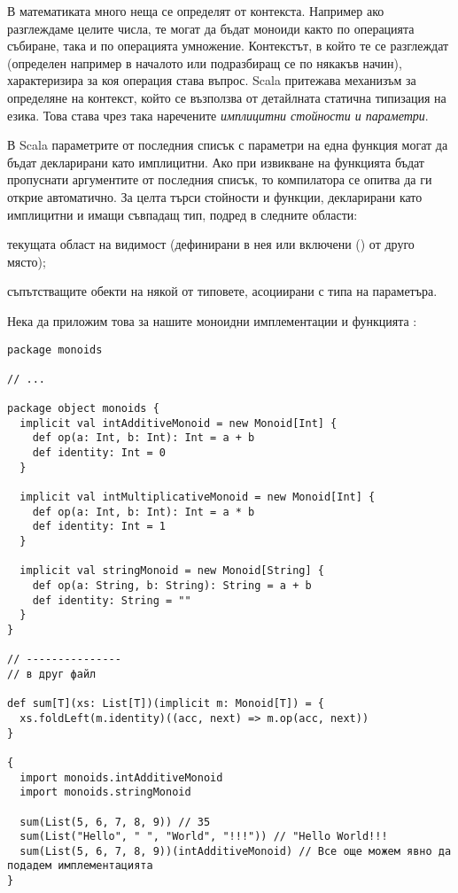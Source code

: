 В математиката много неща се определят от контекста. Например ако разглеждаме целите числа, те могат да бъдат моноиди както по операцията събиране, така и по операцията умножение. Контекстът, в който те се разглеждат (определен например в началото или подразбиращ се по някакъв начин), характеризира за коя операция става въпрос. Scala притежава механизъм за определяне на контекст, който се възползва от детайлната статична типизация на езика. Това става чрез така наречените \emph{имплицитни стойности и параметри}.

В Scala параметрите от последния списък с параметри на една функция могат да бъдат декларирани като имплицитни. Ако при извикване на функцията бъдат пропуснати аргументите от последния списък, то компилатора се опитва да ги открие автоматично. За целта търси стойности и функции, декларирани като имплицитни и имащи съвпадащ тип, подред в следните области:

\begin{enumerate*}
  \item текущата област на видимост (дефинирани в нея или включени () от друго място);
  \item съпътстващите обекти на някой от типовете, асоциирани с типа на параметъра.
\end{enumerate*}

Нека да приложим това за нашите моноидни имплементации и функцията :

\begin{lstlisting}[texcl=true]
package monoids

// ...

package object monoids {
  implicit val intAdditiveMonoid = new Monoid[Int] {
    def op(a: Int, b: Int): Int = a + b
    def identity: Int = 0
  }
  
  implicit val intMultiplicativeMonoid = new Monoid[Int] {
    def op(a: Int, b: Int): Int = a * b
    def identity: Int = 1
  }
  
  implicit val stringMonoid = new Monoid[String] {
    def op(a: String, b: String): String = a + b
    def identity: String = ""
  }
}

// ---------------
// в друг файл

def sum[T](xs: List[T])(implicit m: Monoid[T]) = {
  xs.foldLeft(m.identity)((acc, next) => m.op(acc, next))
}

{
  import monoids.intAdditiveMonoid
  import monoids.stringMonoid
  
  sum(List(5, 6, 7, 8, 9)) // 35
  sum(List("Hello", " ", "World", "!!!")) // "Hello World!!!
  sum(List(5, 6, 7, 8, 9))(intAdditiveMonoid) // Все още можем явно да подадем имплементацията
}
\end{lstlisting}

